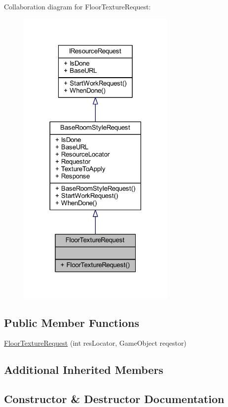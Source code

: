 Collaboration diagram for Floor\+Texture\+Request\+:
\nopagebreak
\begin{figure}[H]
\begin{center}
\leavevmode
\includegraphics[width=218pt]{class_floor_texture_request__coll__graph}
\end{center}
\end{figure}
\subsection*{Public Member Functions}
\begin{DoxyCompactItemize}
\item 
\mbox{\hyperlink{class_floor_texture_request_a9ec1667ad0e439e3178abcfb13b9c3cc}{Floor\+Texture\+Request}} (int res\+Locator, Game\+Object reqestor)
\end{DoxyCompactItemize}
\subsection*{Additional Inherited Members}


\subsection{Constructor \& Destructor Documentation}
\mbox{\label{class_floor_texture_request_a9ec1667ad0e439e3178abcfb13b9c3cc}} 
